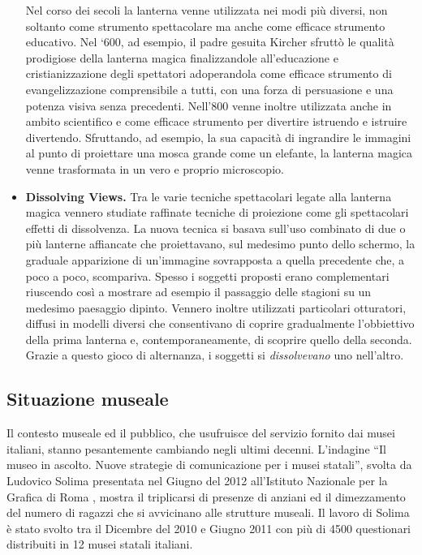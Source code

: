 \begin{itemize}
	Nel corso dei secoli la lanterna venne utilizzata nei modi più diversi, non soltanto come strumento spettacolare ma anche come efficace strumento educativo. Nel ‘600, ad esempio, il padre gesuita Kircher sfruttò le qualità prodigiose della lanterna magica finalizzandole all’educazione e cristianizzazione degli spettatori adoperandola come efficace strumento di evangelizzazione comprensibile a tutti, con una forza di persuasione e una potenza visiva senza precedenti. Nell’800 venne inoltre utilizzata anche in ambito scientifico e come efficace strumento per divertire istruendo e istruire divertendo. Sfruttando, ad esempio, la sua capacità di ingrandire le immagini al punto di proiettare una mosca grande come un elefante, la lanterna magica venne trasformata in un vero e proprio microscopio.
	
	\item \textbf{Dissolving Views.}
	\label{contesto_dissolving_views}
	Tra le varie tecniche spettacolari legate alla lanterna magica vennero studiate raffinate tecniche di proiezione come gli spettacolari effetti di dissolvenza. La nuova tecnica si basava sull’uso combinato di due o più lanterne affiancate che proiettavano, sul medesimo punto dello schermo, la graduale apparizione di un’immagine sovrapposta a quella precedente che, a poco a poco, scompariva. Spesso i soggetti proposti erano complementari riuscendo così a mostrare ad esempio il passaggio delle stagioni su un medesimo paesaggio dipinto. Vennero inoltre utilizzati particolari otturatori, diffusi in modelli diversi che consentivano di coprire gradualmente l’obbiettivo della prima lanterna e, contemporaneamente, di scoprire quello della seconda. Grazie a questo gioco di alternanza, i soggetti si \textit{dissolvevano} uno nell’altro.
	
\end{itemize}

\subsection{Situazione museale}
\label{sec:situazione_museale}

Il contesto museale ed il pubblico, che usufruisce del servizio fornito dai musei italiani, stanno pesantemente cambiando negli ultimi decenni.
L’indagine “Il museo in ascolto. Nuove strategie di comunicazione per i musei statali”, svolta da Ludovico Solima presentata nel Giugno del 2012 all’Istituto Nazionale per la Grafica di Roma \cite{MuseoInAscolto}, mostra il triplicarsi di presenze di anziani ed il dimezzamento del numero di ragazzi che si avvicinano alle strutture museali.
Il lavoro di Solima è stato svolto tra il Dicembre del 2010 e Giugno 2011 con più di 4500 questionari distribuiti in 12 musei statali italiani.


